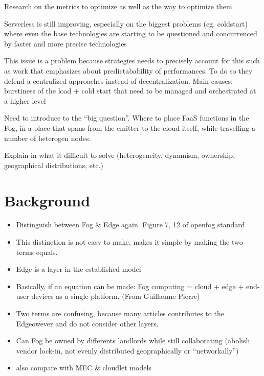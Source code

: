 \documentclass[11pt]{sdm}
\begin{document}
\begin{itemize}
{    \item Research on the metrics to optimize as well as the way to optimize them
    \item Serverless is still improving, especially on the biggest problems (eg. coldstart) where even the base technologies are starting to be questioned and concurrenced by faster and more precise technologies \citet{hykes_solomon_2019}
    \item This issue is a problem because strategies needs to precisely account for this such as  work that emphasizes about predictabability of performances. To do so they defend a centralized approaches instead of decentralization. Main causes: burstiness of the load + cold start that need to be managed and orchestrated at a higher level
    \item Need to introduce to the ``big question''. Where to place FaaS functions in the Fog, in a place that spans from the emitter to the cloud itself, while travelling a number of heterogen nodes.
    \item Explain in what it difficult to solve (heterogeneity, dynamism, ownership, geographical distributions, etc.)
    }

    
\end{itemize}

\section{Background}
\begin{itemize}
    \item Distinguish between Fog \& Edge again. Figure 7, 12 of  openfog standard
    \item This distinction is not easy to make, \citet{baresi_paps_2019} makes it simple by making the two terms equals.
    \item Edge is a layer in the established model \cite{wikipedia_edge_2021}
    \item Basically, if an equation can be made: Fog computing = cloud + edge + end-user devices as a single platform. (From Guillaume Pierre)
    \item Two terms are confusing, because many articles contributes to the Edgeowever and do not consider other layers.
    \item Can Fog be owned by differents landlords while still collaborating (abolish vendor lock-in, not evenly distributed geopraphically or ``networkally'')
    \item also compare with MEC \& cloudlet models
\end{itemize}
\end{document}
